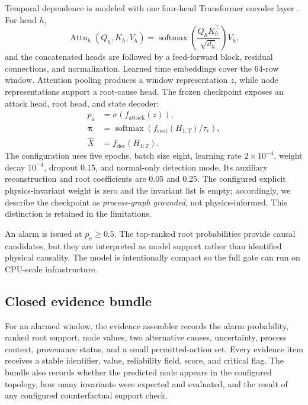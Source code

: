 Temporal dependence is modeled with one four-head Transformer encoder layer \citep{vaswani2017attention}. For head $h$,
\begin{equation}
\operatorname{Attn}_h(Q_h,K_h,V_h)=
\operatorname{softmax}\!\left(\frac{Q_hK_h^\top}{\sqrt{d_h}}\right)V_h,
\label{eq:attention}
\end{equation}
and the concatenated heads are followed by a feed-forward block, residual connections, and normalization. Learned time embeddings cover the 64-row window. Attention pooling produces a window representation $z$, while node representations support a root-cause head. The frozen checkpoint exposes an attack head, root head, and state decoder:
\begin{align}
p_a &= \sigma(f_{\mathrm{attack}}(z)), \\
\boldsymbol{\pi} &= \operatorname{softmax}\!\left(f_{\mathrm{root}}(H_{1:T})/\tau_r\right), \\
\widehat X &= f_{\mathrm{dec}}(H_{1:T}).
\label{eq:heads}
\end{align}
The configuration uses five epochs, batch size eight, learning rate $2\times10^{-4}$, weight decay $10^{-4}$, dropout 0.15, and normal-only detection mode. Its auxiliary reconstruction and root coefficients are 0.05 and 0.25. The configured explicit physics-invariant weight is zero and the invariant list is empty; accordingly, we describe the checkpoint as \emph{process-graph grounded}, not physics-informed. This distinction is retained in the limitations.

An alarm is issued at $p_a\geq0.5$. The top-ranked root probabilities provide causal candidates, but they are interpreted as model support rather than identified physical causality. The model is intentionally compact so the full gate can run on CPU-scale infrastructure.

\subsection{Closed evidence bundle}

For an alarmed window, the evidence assembler records the alarm probability, ranked root support, node values, two alternative causes, uncertainty, process context, provenance status, and a small permitted-action set. Every evidence item receives a stable identifier, value, reliability field, score, and critical flag. The bundle also records whether the predicted node appears in the configured topology, how many invariants were expected and evaluated, and the result of any configured counterfactual support check.

